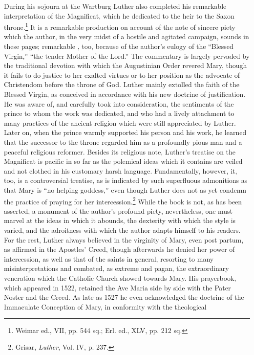 During his sojourn at the Wartburg Luther also completed his
remarkable interpretation of the Magnificat, which he dedicated to
the heir to the Saxon throne.\footnote{Weimar ed., VII, pp. 544 sq.; Erl. ed., XLV, pp. 212 sq.}
It is a remarkable production on account
of the note of sincere piety which the author, in the very
midst of a hostile and agitated campaign, sounds in these pages; remarkable
, too, because of the author’s eulogy of the “Blessed Virgin,”
“the tender Mother of the Lord.” The commentary is largely
pervaded by the traditional devotion with which the Augustinian Order revered
Mary, though it fails to do justice to her exalted virtues
or to her position as the advocate of Christendom before the throne
of God. Luther mainly extolled the faith of the Blessed Virgin,
as conceived in accordance with his new doctrine of justification.
He was aware of, and carefully took into consideration, the sentiments
of the prince to whom the work was dedicated, and who had a lively
attachment to many practices of the ancient religion which were still
appreciated by Luther. Later on, when the prince warmly supported
his person and his work, he learned that the successor to the throne
regarded him as a profoundly pious man and a peaceful religious reformer.
Besides its religious note, Luther’s treatise on the Magnificat is
pacific in so far as the polemical ideas which it contains are veiled and
not clothed in his customary harsh language. Fundamentally, however,
it, too, is a controversial treatise, as is indicated by such superfluous admonitions
as that Mary is “no helping goddess,” even though Luther
does not as yet condemn the practice of praying for her intercession.\footnote
{Grisar, \textit{Luther}, Vol. IV, p. 237.}
While the book is not, as has been asserted, a monument of the
author’s profound piety, nevertheless, one must marvel at the ideas in
which it abounds, the dexterity with which the style is varied, and the
adroitness with which the author adapts himself to his readers. For
the rest, Luther always believed in the virginity of Mary, even post
partum, as affirmed in the Apostles’ Creed, though afterwards he
denied her power of intercession, as well as that of the saints in general,
resorting to many misinterpretations and combated, as extreme
and pagan, the extraordinary veneration which the Catholic Church
showed towards Mary. His prayerbook, which appeared in 1522, retained
the Ave Maria side by side with the Pater Noster and the
Creed. As late as 1527 he even acknowledged the doctrine of the Immaculate
Conception of Mary, in conformity with the theological
